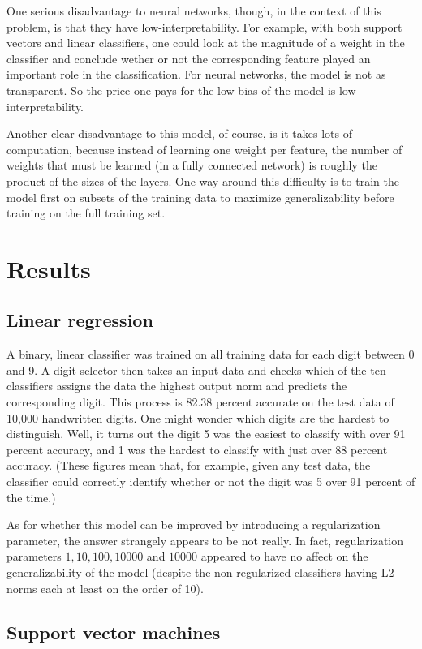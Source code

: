 \documentclass{article}
\begin{document}
One serious disadvantage to neural networks, though, in the context of this problem, is that they have low-interpretability. For example, with both support vectors and linear classifiers, one could look at the magnitude of a weight in the classifier and conclude wether or not the corresponding feature played an important role in the classification. For neural networks, the model is not as transparent. So the price one pays for the low-bias of the model is low-interpretability. 

Another clear disadvantage to this model, of course, is it takes lots of computation, because instead of learning one weight per feature, the number of weights that must be learned (in a fully connected network) is roughly the product of the sizes of the layers. One way around this difficulty is to train the model first on subsets of the training data to maximize generalizability before training on the full training set.

\section{Results}

\subsection{Linear regression}

A binary, linear classifier was trained on all training data for each digit between 0 and 9. A digit selector then takes an input data and checks which of the ten classifiers assigns the data the highest output norm and predicts the corresponding digit. This process is 82.38 percent accurate on the test data of 10,000 handwritten digits. One might wonder which digits are the hardest to distinguish. Well, it turns out the digit 5 was the easiest to classify with over 91 percent accuracy, and 1 was the hardest to classify with just over 88 percent accuracy. (These figures mean that, for example, given any test data, the classifier could correctly identify whether or not the digit was 5 over 91 percent of the time.)

As for whether this model can be improved by introducing a regularization parameter, the answer strangely appears to be not really. In fact, regularization parameters $1,10,100,10000$ and $10000$ appeared to have no affect on the generalizability of the model (despite the non-regularized classifiers having L2 norms each at least on the order of 10).

\subsection{Support vector machines}
\end{document}
